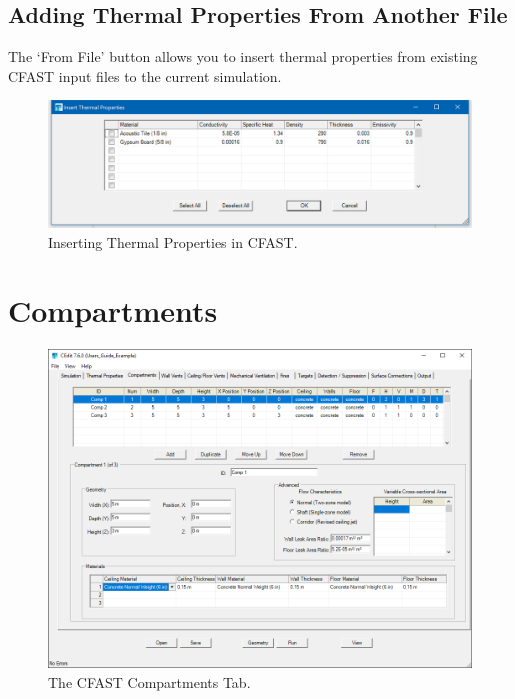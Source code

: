 \section{Adding Thermal Properties From Another File}

The `From File' button allows you to insert thermal properties from existing CFAST input files to the current simulation.

\begin{figure}[h!]
\includegraphics[width=6.5in]{FIGURES/Insert_Thermal_Properties}
\caption[Inserting Thermal Properties in CFAST]{Inserting Thermal Properties in CFAST.}
\end{figure}





\chapter{Compartments}
\begin{figure}[h!]
\begin{center}
\includegraphics[width=6.5in]{FIGURES/Compartment_Geometry_Tab}
\caption[The CFAST Compartments Tab]{The CFAST Compartments Tab.}
\end{center}
\end{figure}

